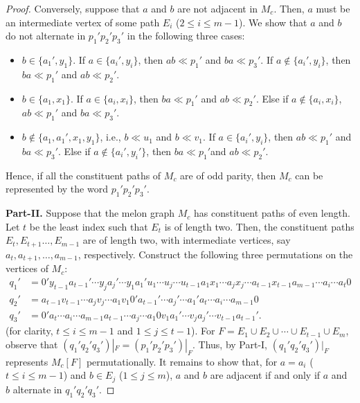 \documentclass[10pt,a4paper]{amsart}
\begin{document}
\begin{proof}
	
	Conversely, suppose that $a$ and $b$ are not adjacent in $M_c$. Then, $a$ must be an intermediate vertex of some path $E_i$ ($2 \le i \le m-1$). We show that  $a$ and $b$ do not alternate in $p_1'p_2'p_3'$ in the following three cases:
	
	\begin{itemize}
		\item $b \in \{a_1', y_1\}$. If $a \in \{a_i', y_i\}$, then $ab \ll p_1'$ and $ba \ll p_3'$. If $a \not  \in \{a_i', y_i\}$, then $ba \ll p_1'$ and $ab \ll p_2'$.
		
		\item $b \in \{a_1,x_1\}$. If $a  \in \{a_i, x_i\}$, then $ba \ll p_1'$ and $ab \ll p_2'$. Else if $a  \not \in \{a_i, x_i\}$, $ab \ll p_1'$ and $ba \ll p_3'$.
		
		\item $b \not \in \{a_1,a_1',x_1,y_1\}$, i.e., $b \ll u_1$ and $b \ll v_1$. If $a  \in \{a_i', y_i\}$, then $ab \ll p_1'$ and $ba \ll p_3'$. Else if $a \not \in \{a_i',y_i'\}$, then $ba \ll p_1'$and $ab \ll p_2'$.
	\end{itemize}
	Hence, if all the constituent paths of $M_c$ are of odd parity,  then $M_c$ can be represented by the word $p_1'p_2'p_3'$. 
	
	\noindent\textbf{Part-II.} Suppose that the melon graph $M_c$ has constituent paths of even length. Let $t$ be the least index such that $E_t$ is of length two. Then, the constituent paths  $E_t, E_{t+1} \ldots, E_{m-1}$ are of length two, with intermediate vertices, say $a_t, a_{t+1}, \ldots, a_{m-1}$, respectively. Construct the following three permutations on the vertices of $M_c$:
	\begin{align*}
		q_1' &= 0' y_{t-1} a_{t-1}' \cdots y_j a_j' \cdots y_1 a_1'  u_{1} \cdots u_j  \cdots  u_{t-1}    a_1 x_1 \cdots a_j x_j   \cdots  a_{t-1} x_{t-1}  a_{m-1} \cdots a_{i} \cdots a_{t} 0 \\
		q_2' &=  a_{t-1}v_{t-1}        \cdots  a_jv_j \cdots a_1 v_1    0'a_{t-1}'     \cdots a_{j}' \cdots a_1' a_t \cdots a_{i} \cdots a_{m-1} 0\\
		q_3' &= 0'  a_t \cdots a_{i} \cdots a_{m-1} a_{t-1} \cdots a_{j} \cdots a_1 0 v_{1}a_{1}' \cdots v_ja_j' \cdots      v_{t-1} a_{t-1}'.
	\end{align*} (for clarity, $t \le i \le m-1$ and $1 \le j \le t-1$). 
	For $F = E_1 \cup E_2 \cup \cdots \cup E_{t-1} \cup E_{m}$, observe that $(q_1'q_2'q_3')|_F = (p_1'p_2'p_3')|_F$. Thus, by Part-I, $(q_1'q_2'q_3')|_F$  represents $M_c[F]$ permutationally. It remains to show that, for $a = a_i$ ($t \le i\le m-1$) and $b \in E_j$ ($1 \le j \le m$), $a$ and $b$ are adjacent if and only if $a$ and $b$ alternate in $q_1'q_2'q_3'$.
	

\end{proof}
\end{document}
